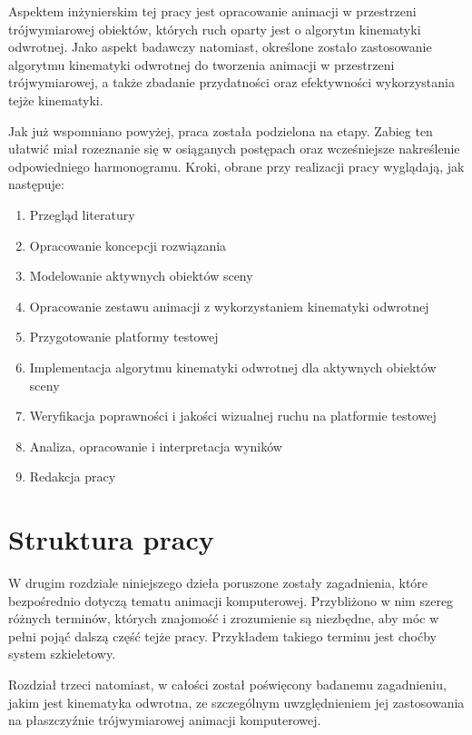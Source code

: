 \documentclass[11pt]{mwrep}
\begin{document}
  Aspektem inżynierskim tej pracy jest opracowanie animacji w przestrzeni trójwymiarowej obiektów, których ruch oparty jest o algorytm kinematyki odwrotnej. Jako aspekt badawczy natomiast, określone zostało zastosowanie algorytmu kinematyki odwrotnej do tworzenia animacji w przestrzeni trójwymiarowej, a także zbadanie przydatności oraz efektywności wykorzystania tejże kinematyki.

  Jak już wspomniano powyżej, praca została podzielona na etapy. Zabieg ten ułatwić miał rozeznanie się w osiąganych postępach oraz wcześniejsze nakreślenie odpowiedniego harmonogramu. Kroki, obrane przy realizacji pracy wyglądają, jak następuje:

  \begin{enumerate}

  \item Przegląd literatury
  \item Opracowanie koncepcji rozwiązania
  \item Modelowanie aktywnych obiektów sceny
  \item Opracowanie zestawu animacji z wykorzystaniem kinematyki odwrotnej
  \item Przygotowanie platformy testowej
  \item Implementacja algorytmu kinematyki odwrotnej dla aktywnych obiektów sceny
  \item Weryfikacja poprawności i jakości wizualnej ruchu na platformie testowej
  \item Analiza, opracowanie i interpretacja wyników
  \item Redakcja pracy

  \end{enumerate}

  \section{Struktura pracy}

  W drugim rozdziale niniejszego dzieła poruszone zostały zagadnienia, które bezpośrednio dotyczą tematu animacji komputerowej. Przybliżono w nim szereg różnych terminów, których znajomość i zrozumienie są niezbędne, aby móc w pełni pojąć dalszą część tejże pracy. Przykładem takiego terminu jest choćby system szkieletowy.

  Rozdział trzeci natomiast, w całości został poświęcony badanemu zagadnieniu, jakim jest kinematyka odwrotna, ze szczególnym uwzględnieniem jej zastosowania na płaszczyźnie trójwymiarowej animacji komputerowej.
  
\end{document}
